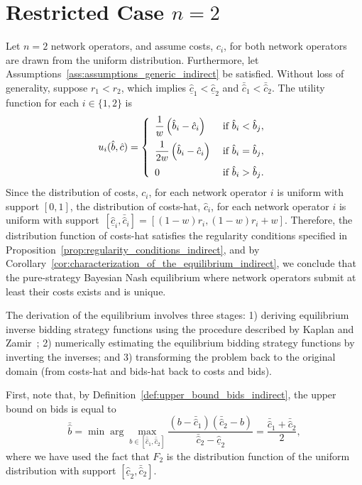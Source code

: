 \section{Restricted Case $n=2$} %
\label{sec:restricted_case_n_2_indirect}
Let $n=2$ network operators, and assume costs, $c_i$, for both network operators are drawn from the uniform distribution. Furthermore, let Assumptions~\ref{ass:assumptions_generic_indirect} be satisfied. Without loss of generality, suppose $r_1 < r_2$, which implies $\underline{\hat{c}}_1 < \underline{\hat{c}}_2$ and $\bar{\hat{c}}_1 < 
\bar{\hat{c}}_2$. The utility function for each $i\in \{1,2\}$ is
\begin{equation*}
  u_i(\hat{b},\hat{c}) = \left\{
  \begin{array}{l l}
    \displaystyle\frac{1}{w}\left(\hat{b}_i-\hat{c}_i\right) & \;\textrm{if } \hat{b}_i < \hat{b}_j,\\[2ex]
    \displaystyle\frac{1}{2w}\left(\hat{b}_i-\hat{c}_i\right) & \;\textrm{if } \hat{b}_i = \hat{b}_j,\\[2ex]
    0 & \;\textrm{if } \hat{b}_i > \hat{b}_j.
  \end{array}\right.
\end{equation*}
Since the distribution of costs, $c_i$, for each network operator $i$ is uniform with support $[0,1]$, the distribution of costs-hat, $\hat{c}_i$, for each network operator $i$ is uniform with support~${[\underline{\hat{c}}_i, \bar{\hat{c}}_i]} = {[(1-w)r_i, (1-w)r_i + w]}$. Therefore, the distribution function of costs-hat satisfies the regularity conditions specified in Proposition~\ref{prop:regularity_conditions_indirect}, and by Corollary~\ref{cor:characterization_of_the_equilibrium_indirect}, we conclude that the pure-strategy Bayesian Nash equilibrium where network operators submit at least their costs exists and is unique.

The derivation of the equilibrium involves three stages: 1) deriving equilibrium inverse bidding strategy functions using the procedure described by Kaplan and Zamir~\cite{KaplanZamir2007}; 2) numerically estimating the equilibrium bidding strategy functions by inverting the inverses; and 3) transforming the problem back to the original domain (from costs-hat and bids-hat back to costs and bids).

First, note that, by Definition~\ref{def:upper_bound_bids_indirect}, the upper bound on bids is equal to
\begin{equation}
  \label{eq:upper_bound_bids_restricted_indirect}
  \bar{\hat{b}} = \min\arg\max_{b\in[\bar{\hat{c}}_1, \bar{\hat{c}}_2]} \frac{(b - \bar{\hat{c}}_1)(\bar{\hat{c}}_2 - b)}{\bar{\hat{c}}_2 - \underline{\hat{c}}_2} = \frac{\bar{\hat{c}}_1 + \bar{\hat{c}}_2}{2},
\end{equation}
where we have used the fact that $F_2$ is the distribution function of the uniform distribution with support $[\underline{\hat{c}}_2, \bar{\hat{c}}_2]$.

